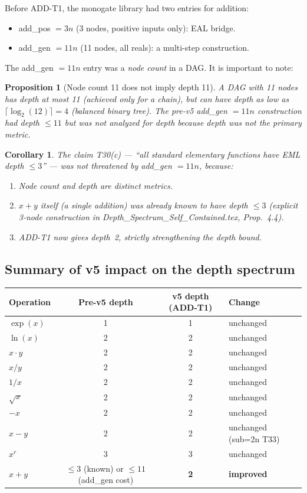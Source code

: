 \documentclass[12pt,a4paper]{article}
\newtheorem{proposition}[theorem]{Proposition}
\newtheorem{corollary}[theorem]{Corollary}
\theoremstyle{definition}
\theoremstyle{remark}
\begin{document}
Before ADD-T1, the monogate library had two entries for addition:
\begin{itemize}
  \item add\_pos $= 3n$ (3 nodes, positive inputs only): EAL bridge.
  \item add\_gen $= 11n$ (11 nodes, all reals): a multi-step construction.
\end{itemize}
The add\_gen $= 11n$ entry was a \emph{node count} in a DAG.
It is important to note:

\begin{proposition}[Node count 11 does not imply depth 11]
\label{prop:depth-not-11}
A DAG with 11 nodes has depth at most 11 (achieved only for a chain),
but can have depth as low as $\lceil\log_2(12)\rceil = 4$ (balanced binary tree).
The pre-v5 add\_gen $= 11n$ construction had depth $\leq 11$ but was not analyzed for depth
because depth was not the primary metric.
\end{proposition}

\begin{corollary}
The claim T30(c) --- ``all standard elementary functions have EML depth $\leq 3$'' ---
was not threatened by add\_gen $= 11n$, because:
\begin{enumerate}
  \item Node count and depth are distinct metrics.
  \item $x + y$ itself (a single addition) was already known to have depth $\leq 3$
        (explicit 3-node construction in Depth\_Spectrum\_Self\_Contained.tex, Prop.~4.4).
  \item ADD-T1 now gives depth~2, strictly strengthening the depth bound.
\end{enumerate}
\end{corollary}

\subsection{Summary of v5 impact on the depth spectrum}

\begin{center}
\begin{tabular}{@{}lccl@{}}
\toprule
\textbf{Operation} & \textbf{Pre-v5 depth} & \textbf{v5 depth (ADD-T1)} & \textbf{Change} \\
\midrule
$\exp(x)$   & 1 & 1 & unchanged \\
$\ln(x)$    & 2 & 2 & unchanged \\
$x \cdot y$ & 2 & 2 & unchanged \\
$x/y$       & 2 & 2 & unchanged \\
$1/x$       & 2 & 2 & unchanged \\
$\sqrt{x}$  & 2 & 2 & unchanged \\
$-x$        & 2 & 2 & unchanged \\
$x - y$     & 2 & 2 & unchanged (sub=2n T33) \\
$x^r$       & 3 & 3 & unchanged \\
$x + y$     & $\leq 3$ (known) or $\leq 11$ (add\_gen cost) & \textbf{2} & \textbf{improved} \\
\bottomrule
\end{tabular}
\end{center}
\end{document}
